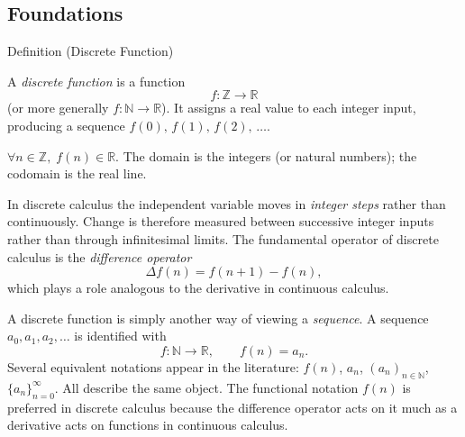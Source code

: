 
\subsection{Foundations}

\begin{definitionbox}{Definition (Discrete Function)}
\begin{definition}
\label{def:discrete-function}
A \emph{discrete function} is a function
\[
f:\mathbb{Z} \to \mathbb{R}
\]
(or more generally \(f:\mathbb{N}\to\mathbb{R}\)).
It assigns a real value to each integer input, producing a sequence
\(f(0),\, f(1),\, f(2),\, \dots\).
\end{definition}
\end{definitionbox}

\begin{remark*}
\(\forall n \in \mathbb{Z},\; f(n) \in \mathbb{R}\).
The domain is the integers (or natural numbers); the codomain is the real line.
\end{remark*}

\begin{remark*}[Interpretation]
In discrete calculus the independent variable moves in \emph{integer steps}
rather than continuously. Change is therefore measured between
successive integer inputs rather than through infinitesimal limits.
The fundamental operator of discrete calculus is the \emph{difference operator}
\[
\Delta f(n)=f(n+1)-f(n),
\]
which plays a role analogous to the derivative in continuous calculus.
\end{remark*}

\begin{remark*}[Exposition]
A discrete function is simply another way of viewing a \emph{sequence}.
A sequence \(a_0, a_1, a_2, \dots\) is identified with
\[
f : \mathbb{N} \to \mathbb{R}, \qquad f(n) = a_n.
\]
Several equivalent notations appear in the literature:
\(f(n)\), \(a_n\), \((a_n)_{n\in\mathbb{N}}\), \(\{a_n\}_{n=0}^{\infty}\).
All describe the same object. The functional notation \(f(n)\) is preferred
in discrete calculus because the difference operator acts on it much as a
derivative acts on functions in continuous calculus.
\end{remark*}

\DefinitionalRoot
